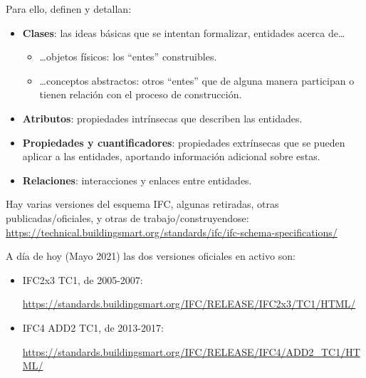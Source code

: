 \documentclass[spanish,10pt,a4paper,final,oneside]{article}
\begin{document}
Para ello, definen y detallan:
\begin{itemize}
\item \textbf{Clases}: las ideas básicas que se intentan formalizar, entidades acerca de\ldots
\begin{itemize}
\item \ldots objetos físicos: los ``entes'' construibles.
\item \ldots conceptos abstractos: otros ``entes'' que de alguna manera participan o tienen relación con el proceso de construcción.
\end{itemize}
\item \textbf{Atributos}: propiedades intrínsecas que describen las entidades.
\item \textbf{Propiedades y cuantificadores}: propiedades extrínsecas que se pueden aplicar a las entidades, aportando información adicional sobre estas.
\item \textbf{Relaciones}: interacciones y enlaces entre entidades.
\end{itemize}

\vspace{0.3cm}
Hay varias versiones del esquema IFC, algunas retiradas, otras publicadas/oficiales, y otras de trabajo/construyendose:
\\ \url{https://technical.buildingsmart.org/standards/ifc/ifc-schema-specifications/}

A día de hoy (Mayo 2021) las dos versiones oficiales en activo son:
\begin{itemize}
\item IFC2x3 TC1, de 2005-2007: \begin{scriptsize}\url{https://standards.buildingsmart.org/IFC/RELEASE/IFC2x3/TC1/HTML/} \end{scriptsize}
\item IFC4 ADD2 TC1, de 2013-2017: \begin{scriptsize}\url{https://standards.buildingsmart.org/IFC/RELEASE/IFC4/ADD2_TC1/HTML/}\end{scriptsize}
\end{itemize}
\end{document}
